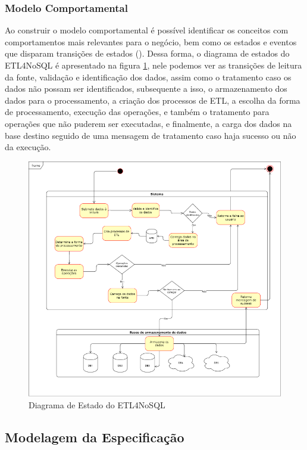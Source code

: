 \subsubsection{Modelo Comportamental}

Ao construir o modelo comportamental é possível identificar os conceitos com comportamentos mais relevantes para o negócio, bem como os estados e eventos que disparam transições de estados (\cite{itana:2005}). Dessa forma, o diagrama de estados do ETL4NoSQL é apresentado na figura \ref{diagrama_estado}, nele podemos ver as transições de leitura da fonte, validação e identificação dos dados, assim como o tratamento caso os dados não possam ser identificados, subsequente a isso, o armazenamento dos dados para o processamento, a criação dos processos de ETL, a escolha da forma de processamento, execução das operações, e também o tratamento para operações que não puderem ser executadas, e finalmente, a carga dos dados na base destino seguido de uma mensagem de tratamento caso haja sucesso ou não da execução.

\begin{figure}[h]
	\centering
	\includegraphics[scale=0.6]{fig/diagrama_estado.png}
	\caption{Diagrama de Estado do ETL4NoSQL}
	\label{diagrama_estado}
\end{figure}

\subsection{Modelagem da Especificação}



